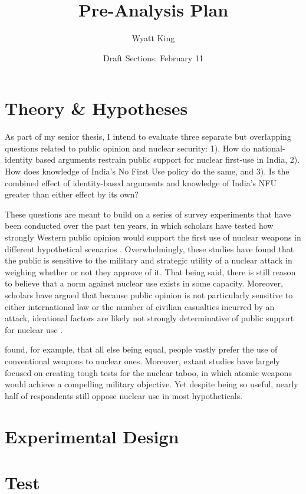 \documentclass[12pt]{article}
\title{Pre-Analysis Plan}
\author{Wyatt King}
\date{Draft Sections: February 11}
\begin{document}
\maketitle

\section{Theory \& Hypotheses}
As part of my senior thesis, I intend to evaluate three separate but overlapping questions related to public opinion and nuclear security: 1). How do national-identity based arguments restrain public support for nuclear first-use in India, 2). How does knowledge of India's No First Use policy do the same, and 3). Is the combined effect of identity-based arguments and knowledge of India's NFU greater than either effect by its own?

These questions are meant to build on a series of survey experiments that have been conducted over the past ten years, in which scholars have tested how strongly Western public opinion would support the first use of nuclear weapons in different hypothetical scenarios \citep{press_atomic_2013, dill_kettles_2022, smetana_moscow_2022, onderco_hawks_2023, schwartz_when_2024}. Overwhelmingly, these studies have found that the public is sensitive to the military and strategic utility of a nuclear attack in weighing whether or not they approve of it. That being said, there is still reason to believe that a norm against nuclear use exists in some capacity. Moreover, scholars have argued that because public opinion is not particularly sensitive to either international law or the number of civilian casualties incurred by an attack, ideational factors are likely not strongly determinative of public support for nuclear use \citep{sagan_revisiting_2017, sagan_atomic_2024}.


\citet{press_atomic_2013} found, for example, that all else being equal, people vastly prefer the use of conventional weapons to nuclear ones. Moreover, extant studies have largely focused on creating tough tests for the nuclear taboo, in which atomic weapons would achieve a compelling military objective. Yet despite being so useful, nearly half of respondents still oppose nuclear use in most hypotheticals.

\section{Experimental Design}

\section{Test}
\end{document}
